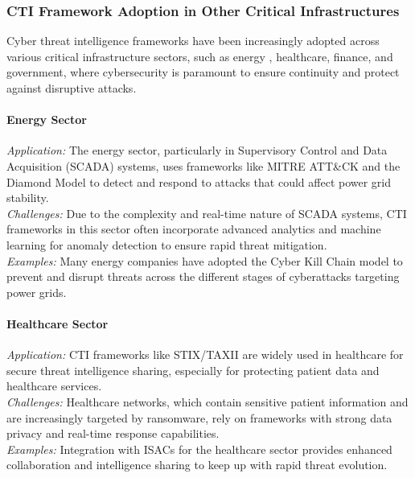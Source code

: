 \documentclass[a4paper,twoside,12pt]{report}
\begin{document}
\subsubsection*{CTI Framework Adoption in Other Critical Infrastructures \citet{kayode2023applications}}
Cyber threat intelligence frameworks have been increasingly adopted across various critical infrastructure sectors, such as energy \citet{gong2021cyber}, healthcare, finance, and government, where cybersecurity is paramount to ensure continuity and protect against disruptive attacks.

\paragraph{Energy Sector \citet{gong2021cyber}}
\textit{Application:} The energy sector, particularly in Supervisory Control and Data Acquisition (SCADA) systems, uses frameworks like MITRE ATT\&CK and the Diamond Model to detect and respond to attacks that could affect power grid stability. \\
\textit{Challenges:} Due to the complexity and real-time nature of SCADA systems, CTI frameworks in this sector often incorporate advanced analytics and machine learning for anomaly detection to ensure rapid threat mitigation. \\
\textit{Examples:} Many energy companies have adopted the Cyber Kill Chain model to prevent and disrupt threats across the different stages of cyberattacks targeting power grids.

\paragraph{Healthcare Sector \citet{krauss2022analysis}}
\textit{Application:} CTI frameworks like STIX/TAXII are widely used in healthcare for secure threat intelligence sharing, especially for protecting patient data and healthcare services. \\
\textit{Challenges:} Healthcare networks, which contain sensitive patient information and are increasingly targeted by ransomware, rely on frameworks with strong data privacy and real-time response capabilities. \\
\textit{Examples:} Integration with ISACs \citet{bugiardini2016international} for the healthcare sector provides enhanced collaboration and intelligence sharing to keep up with rapid threat evolution.
\end{document}

